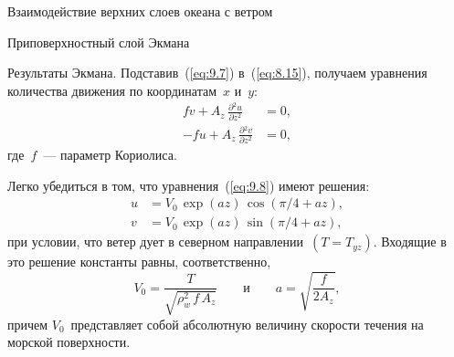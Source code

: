 \begin{chapter}{Взаимодействие верхних слоев океана с ветром}
\begin{section}{Приповерхностный слой Экмана}
\begin{paragraph}{Результаты Экмана.}
Подставив~(\ref{eq:9.7}) в~(\ref{eq:8.15}), получаем уравнения количества
движения по координатам~$x$ и~$y$:
\begin{subequations}\label{eq:9.8}
\begin{align}
  fv +  A_z \, \frac{\partial{^2 u}}{\partial{z^2}} &= 0, \\
  -fu + A_z \, \frac{\partial{^2 v}}{\partial{z^2}} &= 0,
\end{align}
\end{subequations}
где~$f$~--- параметр Кориолиса.
%

Легко убедиться в том, что уравнения~(\ref{eq:9.8}) имеют решения:
\begin{subequations}
\begin{align}
 u &=  V_0\,\exp(az)\,\cos(\pi/4 + az),  \\
 v &=  V_0\,\exp(az)\,\sin(\pi/4 + az),
\end{align}
\end{subequations}
при условии, что ветер дует в северном направлении~$(T = T_{yz})$. 
Входящие в это решение константы равны, соответственно,
\begin{equation}\label{eq:9.10}
 V_0 = \frac{T}{\sqrt{\rho^2_w\,f\,A_z}} \qquad \text{и} \qquad
 a=\sqrt{\frac{f}{2A_z}},
\end{equation}
причем $V_0$~представляет собой абсолютную величину скорости течения 
на морской поверхности.
%


\end{paragraph}
\end{section}
\end{chapter}
